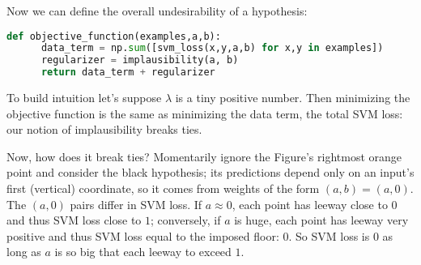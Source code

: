   Now we can define the overall undesirability of a hypothesis:
  \begin{lstlisting}[language=Python, basicstyle=\footnotesize\ttfamily]
    def objective_function(examples,a,b):
      data_term = np.sum([svm_loss(x,y,a,b) for x,y in examples])
      regularizer = implausibility(a, b)
      return data_term + regularizer
  \end{lstlisting}

  To build intuition
  let's suppose $\lambda$ is a tiny positive number.  Then
  minimizing the objective function is the same as minimizing the data term,
  the total SVM loss: our notion of implausibility breaks ties.

  \begin{marginfigure}[0cm]
    \centering
    \caption{%
      \textbf{Balancing goodness-of-fit against intrinsic plausibility leads
      to hypotheses with large margins.}
        A hypothesis's \textbf{margin} is its distance to the closest correctly
        classified training point(s).  Short stems depict these distances for
        two hypotheses (\textbf{black}, {\gre\textbf{gray}}).
        If not for the rightmost {\rng orange point}, we'd prefer \textbf{black} over
        {\gre\textbf{gray}} since it has larger margins.  With large $\lambda$ (i.e., strong
        regularization), we might prefer black over gray even with that
        rightmost {\rng orange point} included, since expanding the margin
        is worth the single misclassification.
    }
  \end{marginfigure}

  Now, how does it break ties?  Momentarily ignore the Figure's rightmost {\rng
  orange point} and consider the black hypothesis; its predictions depend only
  on an input's first (vertical) coordinate, so it comes from weights of the
  form $(a,b) = (a,0)$.
  The $(a,0)$ pairs differ in SVM loss.  If
  $a\approx 0$, each point has leeway close to $0$
  and thus SVM loss close to $1$; conversely, if $a$ is huge, each
  point has leeway very positive and thus SVM loss equal to
  the imposed floor: $0$.  So SVM loss is $0$ as long as
  $a$ is so big that each leeway to exceed $1$.

